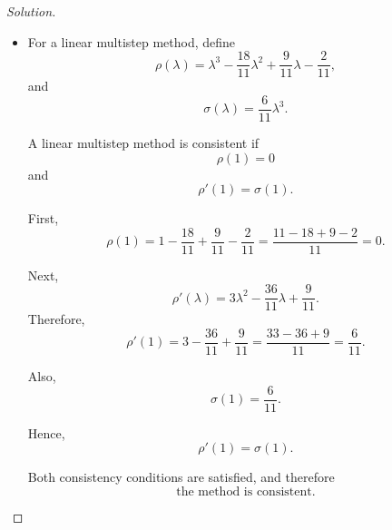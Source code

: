 \documentclass[12pt]{amsart}
\newenvironment{solution}
{\begin{proof}[Solution]}
{\end{proof}}
\begin{document}
\begin{onehalfspace}
\begin{solution}
\begin{itemize}
                \item[(c)] For a linear multistep method, define
                \[
                    \rho(\lambda)
                    =
                    \lambda^3
                    -\frac{18}{11}\lambda^2
                    +\frac{9}{11}\lambda
                    -\frac{2}{11},
                \]
                and
                \[
                    \sigma(\lambda)
                    =
                    \frac{6}{11}\lambda^3.
                \]

                A linear multistep method is consistent if
                \[
                    \rho(1)=0
                \]
                and
                \[
                    \rho'(1)=\sigma(1).
                \]

                First,
                \[
                    \rho(1)
                    =
                    1-\frac{18}{11}+\frac{9}{11}-\frac{2}{11}
                    =
                    \frac{11-18+9-2}{11}
                    =
                    0.
                \]

                Next,
                \[
                    \rho'(\lambda)
                    =
                    3\lambda^2
                    -\frac{36}{11}\lambda
                    +\frac{9}{11}.
                \]
                Therefore,
                \[
                    \rho'(1)
                    =
                    3-\frac{36}{11}+\frac{9}{11}
                    =
                    \frac{33-36+9}{11}
                    =
                    \frac{6}{11}.
                \]

                Also,
                \[
                    \sigma(1)
                    =
                    \frac{6}{11}.
                \]

                Hence,
                \[
                    \rho'(1)=\sigma(1).
                \]

                Both consistency conditions are satisfied, and therefore
                \[
                    \text{the method is consistent}.
                \]

            \end{itemize}
        \end{solution}


\end{onehalfspace}
\end{document}
